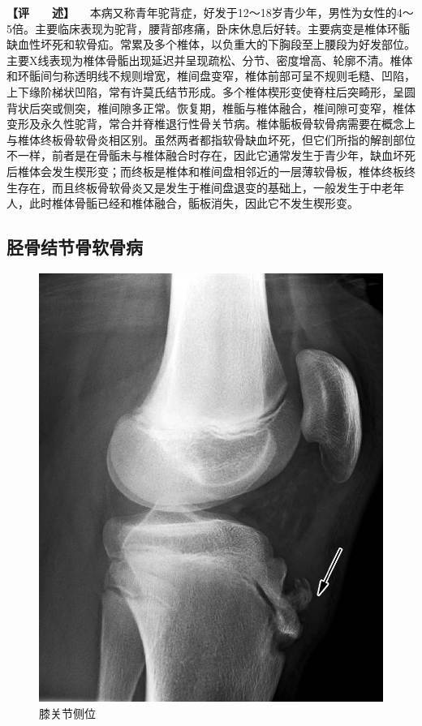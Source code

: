 \textbf{【评　　述】}
　本病又称青年驼背症，好发于12～18岁青少年，男性为女性的4～5倍。主要临床表现为驼背，腰背部疼痛，卧床休息后好转。主要病变是椎体环骺缺血性坏死和软骨疝。常累及多个椎体，以负重大的下胸段至上腰段为好发部位。主要X线表现为椎体骨骺出现延迟并呈现疏松、分节、密度增高、轮廓不清。椎体和环骺间匀称透明线不规则增宽，椎间盘变窄，椎体前部可呈不规则毛糙、凹陷，上下缘阶梯状凹陷，常有许莫氏结节形成。多个椎体楔形变使脊柱后突畸形，呈圆背状后突或侧突，椎间隙多正常。恢复期，椎骺与椎体融合，椎间隙可变窄，椎体变形及永久性驼背，常合并脊椎退行性骨关节病。椎体骺板骨软骨病需要在概念上与椎体终板骨软骨炎相区别。虽然两者都指软骨缺血坏死，但它们所指的解剖部位不一样，前者是在骨骺未与椎体融合时存在，因此它通常发生于青少年，缺血坏死后椎体会发生楔形变；而终板是椎体和椎间盘相邻近的一层薄软骨板，椎体终板终生存在，而且终板骨软骨炎又是发生于椎间盘退变的基础上，一般发生于中老年人，此时椎体骨骺已经和椎体融合，骺板消失，因此它不发生楔形变。

\subsection{胫骨结节骨软骨病}

\begin{figure}[!htbp]
 \centering
 \includegraphics{./images/Image00068.jpg}
 \captionsetup{justification=centering}
 \caption{膝关节侧位}
 \label{fig2-4-7}
  \end{figure} 

